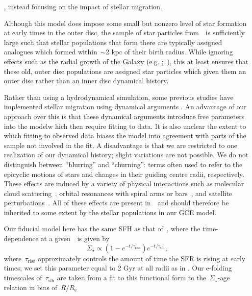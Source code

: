 \documentclass[ms.tex]{subfiles}
\begin{document}
\citep[e.g.][]{Lacey1985, Bilitewski2012, Vincenzo2020}, instead focusing on
the impact of stellar migration.
\par
Although this model does impose some small but nonzero level of star formation
at early times in the outer disc, the sample of star particles from~\hsim~is
sufficiently large such that stellar populations that form there are typically
assigned analogues which formed within~$\sim$2 kpc of their birth radius.
While ignoring effects such as the radial growth of the Galaxy (e.g.
\citealp*{Bird2012};~\citealp{Bird2013}), this at least ensures that these old,
outer disc populations are assigned star particles which given them an outer
disc rather than an inner disc dynamical history.
\par
Rather than using a hydrodynamical simulation, some previous studies have
implemented stellar migration using dynamical arguments
\citep[e.g.][]{Schoenrich2009, Sharma2020}.
An advantage of our approach over this is that these dynamical arguments
introduce free parameters into the modelw hich then require fitting to data.
It is also unclear the extent to which fitting to observed data biases the
model into agreement with parts of the sample not involved in the fit.
A disadvantage is that we are restricted to one realization of our dynamical
history; slight variations are not possible.
We do not distinguish between ``blurring'' and ``churning'': terms often used
to refer to the epicyclic motions of stars and changes in their guiding centre
radii, respectively.
These effects are induced by a variety of physical interactions such as
molecular cloud scattering~\citep{Mihalas1981, Jenkins1990, Jenkins1992},
orbital resonances with spiral arms or bars~\citep{Sellwood2002, Minchev2011},
and satellite perturbations~\citep{Bird2012}.
All of these effects are present in~\hsim~and should therefore be inherited to
some extent by the stellar populations in our GCE model.
\par
Our fiducial model here has the same SFH as that of~\citet{Johnson2021}, where
the time-dependence at a given~\rgal~is given by
\begin{equation}
\dot{\Sigma}_\star \propto (1 - e^{-t / \tau_\text{rise}})
e^{-t/\tau_\text{sfh}},
\end{equation}
where~$\tau_\text{rise}$ approximately controls the amount of time the SFR is
rising at early times; we set this parameter equal to 2 Gyr at all radii as in
\citet{Johnson2021}.
Our e-folding timescales of~$\tau_\text{sfh}$ are taken from a fit to this
functional form to the~$\Sigma_\star$-age relation in bins of~$R / R_\text{e}$
\end{document}
